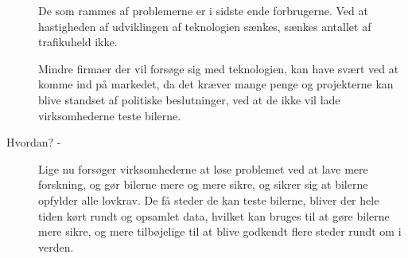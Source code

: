 \documentclass{article}
\begin{document}
\begin{description}
		De som rammes af problemerne er i sidste ende forbrugerne. Ved at hastigheden af udviklingen af teknologien sænkes, sænkes antallet af trafikuheld ikke. 

		Mindre firmaer der vil forsøge sig med teknologien, kan have svært ved at komme ind på markedet, da det kræver mange penge og projekterne kan blive standset af politiske beslutninger, ved at de ikke vil lade virksomhederne teste bilerne.

		\item[Hvordan? -] Lige nu forsøger virksomhederne at løse problemet ved at lave mere forskning, og gør bilerne mere og mere sikre, og sikrer sig at bilerne opfylder alle lovkrav. De få steder de kan teste bilerne, bliver der hele tiden kørt rundt og opsamlet data, hvilket kan bruges til at gøre bilerne mere sikre, og mere tilbøjelige til at blive godkendt flere steder rundt om i verden.
	\end{description}
\end{document}

